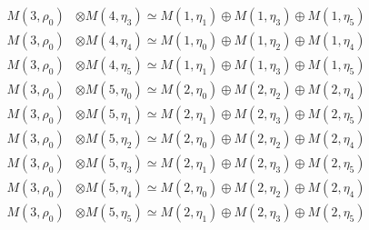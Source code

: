 \begin{align*}
M(3,\rho_{0}) &\otimes M(4,\eta_{3}) \simeq M(1,\eta_{1}) \oplus M(1,\eta_{3}) \oplus M(1,\eta_{5}) \\
M(3,\rho_{0}) &\otimes M(4,\eta_{4}) \simeq M(1,\eta_{0}) \oplus M(1,\eta_{2}) \oplus M(1,\eta_{4}) \\
M(3,\rho_{0}) &\otimes M(4,\eta_{5}) \simeq M(1,\eta_{1}) \oplus M(1,\eta_{3}) \oplus M(1,\eta_{5}) \\
M(3,\rho_{0}) &\otimes M(5,\eta_{0}) \simeq M(2,\eta_{0}) \oplus M(2,\eta_{2}) \oplus M(2,\eta_{4}) \\
M(3,\rho_{0}) &\otimes M(5,\eta_{1}) \simeq M(2,\eta_{1}) \oplus M(2,\eta_{3}) \oplus M(2,\eta_{5}) \\
M(3,\rho_{0}) &\otimes M(5,\eta_{2}) \simeq M(2,\eta_{0}) \oplus M(2,\eta_{2}) \oplus M(2,\eta_{4}) \\
M(3,\rho_{0}) &\otimes M(5,\eta_{3}) \simeq M(2,\eta_{1}) \oplus M(2,\eta_{3}) \oplus M(2,\eta_{5}) \\
M(3,\rho_{0}) &\otimes M(5,\eta_{4}) \simeq M(2,\eta_{0}) \oplus M(2,\eta_{2}) \oplus M(2,\eta_{4}) \\
M(3,\rho_{0}) &\otimes M(5,\eta_{5}) \simeq M(2,\eta_{1}) \oplus M(2,\eta_{3}) \oplus M(2,\eta_{5}) \\
\end{align*}

